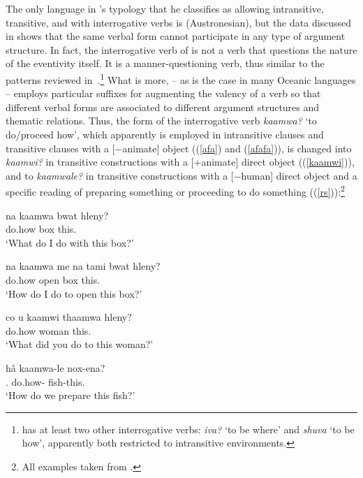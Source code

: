 \documentclass[output=paper]{langsci/langscibook}
\begin{document}
The only language in \citet{hagege2008}'s typology that he classifies as
allowing intransitive, transitive, and  with
interrogative verbs is  (Austronesian), but the data discussed
in \citet{bril2002,bril2004} shows that the same verbal form cannot participate
in any type of argument structure. In fact, the interrogative verb of
 is not a verb that questions the nature of the eventivity
itself. It is a manner-questioning verb, thus similar to the patterns reviewed
in~.\footnote{ has at least two other
interrogative verbs: \emph{iva?} `to be where' and \emph{shuva} `to be how',
apparently both restricted to intransitive environments.} What is more,
 -- as is the case in many Oceanic languages -- employs
particular suffixes for augmenting the valency of a verb so that different
verbal forms are associated to different argument structures and thematic
relations. Thus, the form of the interrogative verb \emph{kaamwa?} `to
do/proceed how', which apparently is employed in intransitive clauses and
transitive clauses with a [−animate] object ((\ref{afa}) and (\ref{afafa})), is
changed into \emph{kaamwi?} in transitive constructions with a [+animate]
direct object ((\ref{kaamwi})), and to \emph{kaamwale?} in transitive
constructions with a [−human] direct object and a specific reading of preparing
something or proceeding to do something ((\ref{rs})):\footnote{All examples
taken from \citet[50]{bril2002}.}

\begin{exe}
    \ex \label{afa} 
\sn\gll na kaamwa	bwat hleny? \\
\Fsg{} do.how box this.\Dei{}\\
\glt `What do I do with this box?'

\ex \label{afafa} 
\sn\gll na kaamwa	me	na tami bwat hleny?\\
\Fsg{} do.how \Depend{}	\Fsg{} open box this.\Dei{}\\
\glt `How do I do to open this box?'

\ex \label{kaamwi}
\sn\gll    co u kaamwi thaamwa hleny?\\
            \Ssg{} \Acc{} do.how woman	this.\Dei{}\\
\glt `What did you do to this woman?'

\ex \label{rs}
\sn\gll h\^{a}	kaamwa-le	nox-ena?\\
\Fpl.\Incl{} do.how-\Tr{} fish-this.\Dei{}\\
\glt `How do we prepare this fish?'
\end{exe}
\end{document}
